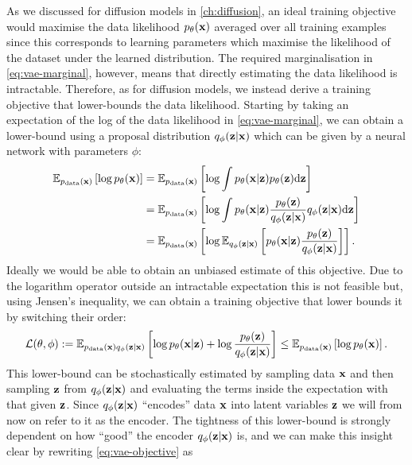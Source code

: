 As we discussed for diffusion models in \cref{ch:diffusion}, an ideal training objective would maximise the data likelihood $p_\theta({\mathbf{x}})$ averaged over all training examples since this corresponds to learning parameters which maximise the likelihood of the dataset under the learned distribution. The required marginalisation in \cref{eq:vae-marginal}, however, means that directly estimating the data likelihood is intractable. Therefore, as for diffusion models, we instead derive a training objective that lower-bounds the data likelihood. Starting by taking an expectation of the log of the data likelihood in \cref{eq:vae-marginal}, we can obtain a lower-bound using a proposal distribution $q_\phi({\mathbf{z}}|{\mathbf{x}})$ which can be given by a neural network with parameters $\phi$: %
\begin{align}
    \mathbb{E}_{p_{\rm{data}}({\mathbf{x}})} \left[ \log p_\theta({\mathbf{x}}) \right] &= \mathbb{E}_{p_{\rm{data}}({\mathbf{x}})} \left[ \log \int p_\theta({\mathbf{x}}|{\mathbf{z}})p_\theta({\mathbf{z}}) \mathrm{d}{\mathbf{z}} \right] \\
    &= \mathbb{E}_{p_{\rm{data}}({\mathbf{x}})} \left[ \log \int p_\theta({\mathbf{x}}|{\mathbf{z}}) \frac{p_\theta({\mathbf{z}})}{q_\phi({\mathbf{z}}|{\mathbf{x}})} q_\phi({\mathbf{z}}|{\mathbf{x}}) \mathrm{d}{\mathbf{z}} \right] \\
    &= \mathbb{E}_{p_{\rm{data}}({\mathbf{x}})} \left[ \log \mathbb{E}_{q_\phi({\mathbf{z}}|{\mathbf{x}})} \left[ p_\theta({\mathbf{x}}|{\mathbf{z}}) \frac{p_\theta({\mathbf{z}})}{q_\phi({\mathbf{z}}|{\mathbf{x}})} \right] \right]. \label{eq:vae-marginal-is}
\end{align}
Ideally we would be able to obtain an unbiased estimate of this objective. Due to the logarithm operator outside an intractable expectation this is not feasible but, using Jensen's inequality, we can obtain a training objective that lower bounds it by switching their order: 
\begin{align}
    {\mathcal{L}}(\theta, \phi) := \mathbb{E}_{p_{\rm{data}}({\mathbf{x}})q_\phi({\mathbf{z}}|{\mathbf{x}})} \left[ \log p_\theta({\mathbf{x}}|{\mathbf{z}}) + \log \frac{p_\theta({\mathbf{z}})}{q_\phi({\mathbf{z}}|{\mathbf{x}})} \right] \leq \mathbb{E}_{p_{\rm{data}}({\mathbf{x}})} \left[ \log p_\theta({\mathbf{x}}) \right].
    \label{eq:vae-objective}
\end{align}
This lower-bound can be stochastically estimated by sampling data ${\mathbf{x}}$ and then sampling ${\mathbf{z}}$ from $q_\phi({\mathbf{z}}|{\mathbf{x}})$ and evaluating the terms inside the expectation with that given ${\mathbf{z}}$. Since $q_\phi({\mathbf{z}}|{\mathbf{x}})$ ``encodes'' data ${\mathbf{x}}$ into latent variables ${\mathbf{z}}$ we will from now on refer to it as the encoder. The tightness of this lower-bound is strongly dependent on how ``good'' the encoder $q_\phi({\mathbf{z}}|{\mathbf{x}})$ is, and we can make this insight clear by rewriting \cref{eq:vae-objective} as
